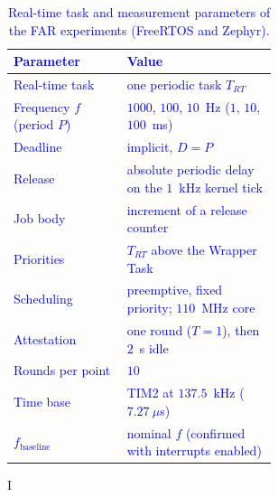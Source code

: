 \documentclass[journal]{IEEEtran}
\newcommand\ben[1]{\textcolor{blue}{#1}}
\begin{document}
\begin{table}[!ht]
  \centering
  \small
  \setlength{\tabcolsep}{4pt}
  \ben{%
  \begin{tabular}{@{}lp{0.58\linewidth}@{}}
    \toprule
    \textbf{Parameter} & \textbf{Value} \\
    \midrule
    Real-time task & one periodic task $T_{RT}$ \\
    Frequency $f$ (period $P$) & $1000$, $100$, $10$~Hz ($1$, $10$, $100$~ms) \\
    Deadline & implicit, $D = P$ \\
    Release & absolute periodic delay on the $1$~kHz kernel tick \\
    Job body & increment of a release counter \\
    Priorities & $T_{RT}$ above the Wrapper Task \\
    Scheduling & preemptive, fixed priority; $110$~MHz core \\
    Attestation & one round ($T = 1$), then $2$~s idle \\
    Rounds per point & $10$ \\
    Time base & TIM2 at $137.5$~kHz ($7.27~\mu$s) \\
    $f_{\text{baseline}}$ & nominal $f$ (confirmed with interrupts enabled) \\
    \bottomrule
  \end{tabular}}
  \caption{\ben{Real-time task and measurement parameters of the FAR experiments (FreeRTOS and Zephyr).}}
  \label{tab:rt-task}
\end{table}I


\end{document}
